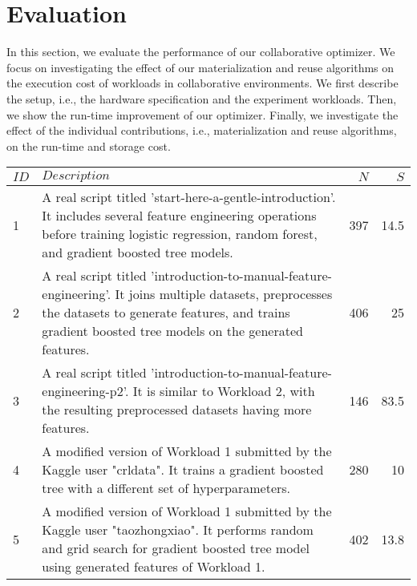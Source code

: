 \section{Evaluation} \label{sec-evaluation} 
In this section, we evaluate the performance of our collaborative optimizer.
We focus on investigating the effect of our materialization and reuse algorithms on the execution cost of workloads in collaborative environments.
We first describe the setup, i.e., the hardware specification and the experiment workloads.
Then, we show the run-time improvement of our optimizer.
Finally, we investigate the effect of the individual contributions, i.e., materialization and reuse algorithms, on the run-time and storage cost.
\begin{table*}[t]
\begin{tabular}{lp{}rr}
\hline
\textbf{$ID$} & \textbf{$Description$}& \textbf{$N$}& \textbf{$S$}   \\
\hline
1 &  \parbox[t]{0.84\textwidth}{\linespread{0.5}\selectfont \small A real script titled 'start-here-a-gentle-introduction'. It includes several feature engineering operations before training logistic regression, random forest, and gradient boosted tree models.} & 397 & 14.5\\[0.4cm]

2 &   \parbox[t]{0.84\textwidth}{\linespread{0.5}\selectfont \small A real script titled 'introduction-to-manual-feature-engineering'. It joins multiple datasets, preprocesses the datasets to generate features, and trains gradient boosted tree models on the generated features.} & 406 & 25\\[0.4cm]

3 &   \parbox[t]{0.84\textwidth}{\linespread{0.5}\selectfont \small A real script titled 'introduction-to-manual-feature-engineering-p2'. It is similar to Workload 2, with the resulting preprocessed datasets having more features.} & 146 & 83.5\\[0.15cm]

4 & \parbox[t]{0.84\textwidth}{\linespread{0.5}\selectfont \small A modified version of Workload 1 submitted by the Kaggle user "crldata". It trains a gradient boosted tree with a different set of hyperparameters.} & 280 & 10\\[0.4cm]

5 & \parbox[t]{0.84\textwidth}{\linespread{0.5}\selectfont \small A modified version of Workload 1 submitted by the Kaggle user "taozhongxiao". It performs random and grid search for gradient boosted tree model using generated features of Workload 1.} & 402 & 13.8\\[0.4cm]


\end{tabular}
\end{table*}
